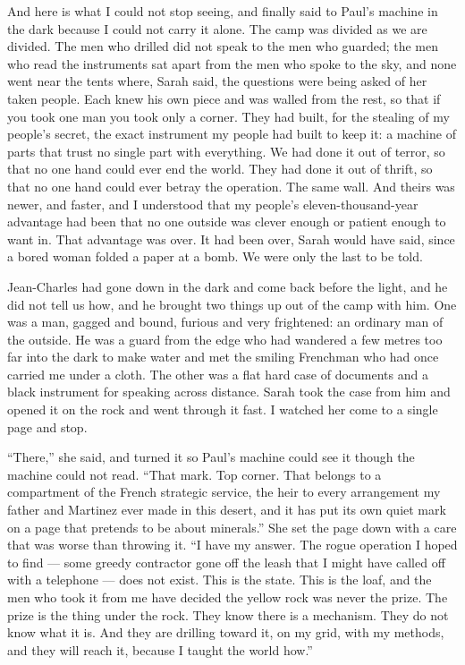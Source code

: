 And here is what I could not stop seeing, and finally said to Paul's machine in the dark because I could not carry it alone. The camp was divided as we are divided. The men who drilled did not speak to the men who guarded; the men who read the instruments sat apart from the men who spoke to the sky, and none went near the tents where, Sarah said, the questions were being asked of her taken people. Each knew his own piece and was walled from the rest, so that if you took one man you took only a corner. They had built, for the stealing of my people's secret, the exact instrument my people had built to keep it: a machine of parts that trust no single part with everything. We had done it out of terror, so that no one hand could ever end the world. They had done it out of thrift, so that no one hand could ever betray the operation. The same wall. And theirs was newer, and faster, and I understood that my people's eleven-thousand-year advantage had been that no one outside was clever enough or patient enough to want in. That advantage was over. It had been over, Sarah would have said, since a bored woman folded a paper at a bomb. We were only the last to be told.\par

\ornament

Jean-Charles had gone down in the dark and come back before the light, and he did not tell us how, and he brought two things up out of the camp with him. One was a man, gagged and bound, furious and very frightened: an ordinary man of the outside. He was a guard from the edge who had wandered a few metres too far into the dark to make water and met the smiling Frenchman who had once carried me under a cloth. The other was a flat hard case of documents and a black instrument for speaking across distance. Sarah took the case from him and opened it on the rock and went through it fast. I watched her come to a single page and stop.\par

``There,'' she said, and turned it so Paul's machine could see it though the machine could not read. ``That mark. Top corner. That belongs to a compartment of the French strategic service, the heir to every arrangement my father and Martinez ever made in this desert, and it has put its own quiet mark on a page that pretends to be about minerals.'' She set the page down with a care that was worse than throwing it. ``I have my answer. The rogue operation I hoped to find --- some greedy contractor gone off the leash that I might have called off with a telephone --- does not exist. This is the state. This is the loaf, and the men who took it from me have decided the yellow rock was never the prize. The prize is the thing under the rock. They know there is a mechanism. They do not know what it is. And they are drilling toward it, on my grid, with my methods, and they will reach it, because I taught the world how.''\par

